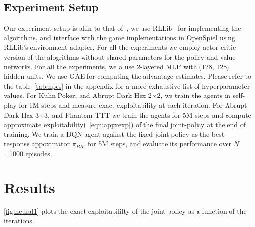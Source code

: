 \subsection{Experiment Setup}
Our experiment setup is akin to that of~\cite{sokotaUnified2023}, we use
RLLib~\cite{liangRLlib2018} for implementing the algorithms, and interface with the game
implementations in OpenSpiel using RLLib's environment adapter.
For all the experiments we employ actor-critic version of the alogrithms without shared parameters
for the policy and value networks.
For all the experiments, we a use 2-layered MLP with (128, 128) hidden units.
We use GAE for computing the advantage estimates.
Please refer to the table~\ref{tab:hpes} in the appendix for a more exhaustive list of
hyperparameter values.
For Kuhn Poker, and Abrupt Dark Hex 2$\times$2, we train the agents in self-play for 1M steps and
measure exact exploitability at each iteration.
For Abrupt Dark Hex 3$\times$3, and Phantom TTT we train the agents for 5M steps and compute
approximate exploitability(~\ref{eqn:appxexp}) of the final joint-policy at the end of training.
We train a DQN agent against the fixed joint policy as the best-response appoximator $\pi_{BR}$,
for 5M steps, and evaluate its performance over $N$=1000 episodes.

\section{Results}

\ref{fig:neural1} plots the exact exploitabililty of the joint policy as a function of the
iterations.

